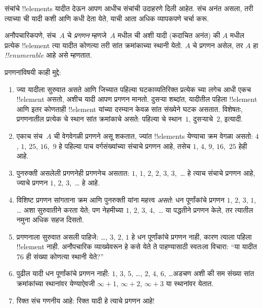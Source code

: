 \documentclass[../../../include/open-logic-section]{subfiles}
\begin{document}











\begin{explain}
संचांचे !!{element}s यादीत देऊन आपण आधीच संचांची उदाहरणे दिली आहेत.
संच अनंत असला, तरी त्याच्या ची यादी कशी आणि कधी
देता येते, याची आता अधिक व्यापकपणे चर्चा करू.
\end{explain}

\begin{defn}[प्रगणनाची अनौपचारिक व्याख्या]
अनौपचारिकपणे, संच~$A$ चे \emph{प्रगणन} म्हणजे~$A$ मधील
ची अशी यादी (कदाचित अनंत) की $A$ मधील प्रत्येक
!!{element} त्या यादीत कोणत्या तरी सांत क्रमांकाच्या स्थानी येतो.
$A$ चे प्रगणन असेल, तर $A$ हा \emph{!!{enumerable}} आहे असे म्हणतात.
\end{defn}

\begin{explain}
प्रगणनांविषयी काही मुद्दे:
\begin{enumerate}
\item ज्या यादीला सुरुवात असते आणि जिच्यात पहिल्या घटकाव्यतिरिक्त
  प्रत्येक च्या लगेच आधी एकच !!{element} असतो, अशीच यादी
  आपण प्रगणन मानतो. दुसऱ्या शब्दांत, यादीतील पहिला !!{element}
  आणि इतर कोणताही !!{element} यांच्या दरम्यान केवळ सांत संख्येने घटक
  असतात. विशेषतः, प्रगणनातील प्रत्येक चे स्थान सांत
  क्रमांकाचे असते: पहिल्या चे स्थान~$1$, दुसऱ्याचे~$2$, इत्यादी.
\item एकाच संच~$A$ ची वेगवेगळी प्रगणने असू शकतात, ज्यांत
  !!{element}s येण्याचा क्रम वेगळा असतो: $4$, $1$, $25$, $16$,~$9$
  हे पहिल्या पाच वर्गसंख्यांच्या संचाचे प्रगणन आहे, तसेच
  $1$, $4$, $9$, $16$,~$25$ हेही आहे.
\item पुनरुक्ती असलेली प्रगणनेही प्रगणनेच असतात: $1$, $1$, $2$,
  $2$, $3$, $3$,~\dots{} हे त्याच संचाचे प्रगणन आहे, ज्याचे
  प्रगणन $1$, $2$, $3$,~\dots{} हे आहे.
\item विशिष्ट प्रगणन सांगताना क्रम आणि पुनरुक्ती यांना महत्त्व
  \emph{असते}: धन पूर्णांकांचे प्रगणन $1$, $2$, $3$, $1$, \dots{}
  अशा सुरुवातीने करता येते; पण नेहमीच्या $1$, $2$, $3$, $4$,~\dots
  या पद्धतीने प्रगणन केले, तर त्यातील नमुना अधिक सहज दिसतो.
\item प्रगणनाला सुरुवात असली पाहिजे: \dots, $3$, $2$, $1$ हे
  धन पूर्णांकांचे प्रगणन नाही, कारण त्याला पहिला !!{element} नाही.
  अनौपचारिक व्याख्येवरून हे कसे येते ते पाहण्यासाठी स्वतःला विचारा:
  ``या यादीत 76 ही संख्या कोणत्या स्थानी येते?''
\item पुढील यादी धन पूर्णांकांचे प्रगणन नाही:
  $1$, $3$, $5$, \dots, $2$, $4$, $6$, \dots\@ अडचण अशी की
  सम संख्या सांत क्रमांकांच्या स्थानांवर येण्याऐवजी
  $\infty + 1$, $\infty + 2$, $\infty + 3$ या स्थानांवर येतात.
\item रिक्त संच गणनीय आहे: रिक्त यादी हे त्याचे प्रगणन आहे!{}
\end{enumerate}
\end{explain}
\end{document}
